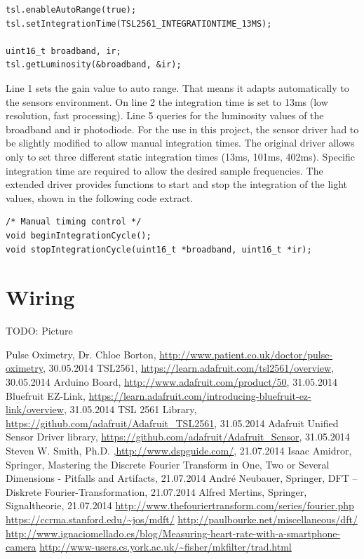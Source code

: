 \documentclass[notitlepage]{scrreprt}
\begin{document}
\begin{lstlisting}[caption=Adafruit driver]
tsl.enableAutoRange(true);
tsl.setIntegrationTime(TSL2561_INTEGRATIONTIME_13MS);

uint16_t broadband, ir;
tsl.getLuminosity(&broadband, &ir);
\end{lstlisting}

Line 1 sets the gain value to auto range. That means it adapts automatically to the sensors environment. On line 2 the integration time is set to 13ms (low resolution, fast processing). Line 5 queries for the luminosity values of the broadband and ir photodiode. For the use in this project, the sensor driver had to be slightly modified to allow manual integration times. The original driver allows only to set three different static integration times (13ms, 101ms, 402ms). Specific integration time are required to allow the desired sample frequencies. The extended driver provides functions to start and stop the integration of the light values, shown in the following code extract.

\begin{lstlisting}[caption=Adafruit\_TSL2561\_U.h]
/* Manual timing control */
void beginIntegrationCycle();
void stopIntegrationCycle(uint16_t *broadband, uint16_t *ir);
\end{lstlisting}

\newpage

\section{Wiring}
\label{sec:wiring}
TODO: Picture

\begin{thebibliography}{999}
	 Pulse Oximetry, Dr. Chloe Borton, \url{http://www.patient.co.uk/doctor/pulse-oximetry}, 30.05.2014
	 TSL2561, \url{https://learn.adafruit.com/tsl2561/overview}, 30.05.2014
	 Arduino Board, \url{http://www.adafruit.com/product/50}, 31.05.2014
	 Bluefruit EZ-Link, \url{https://learn.adafruit.com/introducing-bluefruit-ez-link/overview}, 31.05.2014
	 TSL 2561 Library, \url{https://github.com/adafruit/Adafruit_TSL2561}, 31.05.2014
	 Adafruit Unified Sensor Driver library, \url{https://github.com/adafruit/Adafruit_Sensor}, 31.05.2014
	 Steven W. Smith, Ph.D. ,\url{http://www.dspguide.com/}, 21.07.2014
	 Isaac Amidror, Springer, Mastering the Discrete Fourier Transform in One, Two or Several Dimensions - Pitfalls and Artifacts, 21.07.2014
	 André Neubauer, Springer, DFT – Diskrete Fourier-Transformation, 21.07.2014
	 Alfred Mertins, Springer, Signaltheorie, 21.07.2014
	 \url{http://www.thefouriertransform.com/series/fourier.php}
	 \url{https://ccrma.stanford.edu/~jos/mdft/}
	 \url{http://paulbourke.net/miscellaneous/dft/}
	 \url{http://www.ignaciomellado.es/blog/Measuring-heart-rate-with-a-smartphone-camera}
	 \url{http://www-users.cs.york.ac.uk/~fisher/mkfilter/trad.html}
\end{thebibliography}
\end{document}
